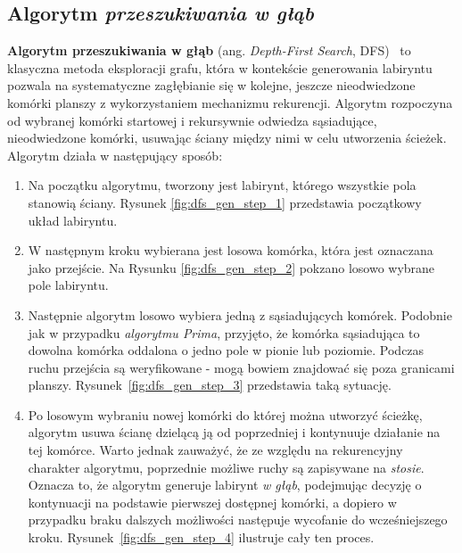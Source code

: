 \subsection{Algorytm \textit{przeszukiwania w głąb}}

\textbf{Algorytm przeszukiwania w głąb} (ang. \textit{Depth-First Search}, DFS)~\cite{cormen2009} to klasyczna metoda eksploracji grafu, która w kontekście generowania labiryntu pozwala na systematyczne zagłębianie się w kolejne, jeszcze nieodwiedzone komórki planszy z wykorzystaniem mechanizmu rekurencji. Algorytm rozpoczyna od wybranej komórki startowej i rekursywnie odwiedza sąsiadujące, nieodwiedzone komórki, usuwając ściany między nimi w celu utworzenia ścieżek. Algorytm działa w następujący sposób:

\begin{enumerate}
    \item Na początku algorytmu, tworzony jest labirynt, którego wszystkie pola stanowią ściany. Rysunek \ref{fig:dfs_gen_step_1} przedstawia początkowy układ labiryntu.
    
    

    \item W następnym kroku wybierana jest losowa komórka, która jest oznaczana jako przejście. Na Rysunku \ref{fig:dfs_gen_step_2} pokzano losowo wybrane pole labiryntu.

    

    \item Następnie algorytm losowo wybiera jedną z sąsiadujących komórek. Podobnie jak w przypadku \textit{algorytmu Prima}, przyjęto, że komórka sąsiadująca to dowolna komórka oddalona o jedno pole w pionie lub poziomie. Podczas ruchu przejścia są weryfikowane - mogą bowiem znajdować się poza granicami planszy. Rysunek~\ref{fig:dfs_gen_step_3} przedstawia taką sytuację.
    
    

    \item Po losowym wybraniu nowej komórki do której można utworzyć ścieżkę, algorytm usuwa ścianę dzielącą ją od poprzedniej i kontynuuje działanie na tej komórce. Warto jednak zauważyć, że ze względu na rekurencyjny charakter algorytmu, poprzednie możliwe ruchy są zapisywane na \textit{stosie}. Oznacza to, że algorytm generuje labirynt \textit{w głąb}, podejmując decyzję o kontynuacji na podstawie pierwszej dostępnej komórki, a dopiero w przypadku braku dalszych możliwości następuje wycofanie do wcześniejszego kroku. Rysunek~\ref{fig:dfs_gen_step_4} ilustruje cały ten proces.


\end{enumerate}

